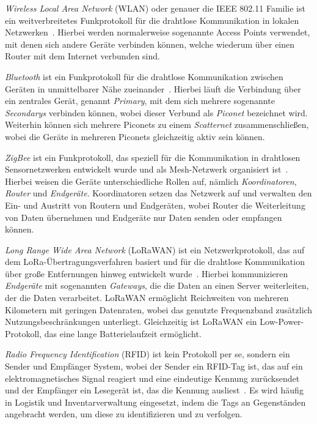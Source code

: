 \emph{Wireless Local Area Network} (WLAN) oder genauer die IEEE 802.11 Familie ist ein weitverbreitetes Funkprotokoll für die drahtlose Kommunikation in lokalen Netzwerken~\cite{wifi}.
Hierbei werden normalerweise sogenannte Access Points verwendet, mit denen sich andere Geräte verbinden können, welche wiederum über einen Router mit dem Internet verbunden sind.

\emph{Bluetooth} ist ein Funkprotokoll für die drahtlose Kommunikation zwischen Geräten in unmittelbarer Nähe zueinander~\cite{bluetooth}.
Hierbei läuft die Verbindung über ein zentrales Gerät, genannt \emph{Primary}, mit dem sich mehrere sogenannte \emph{Secondarys} verbinden können, wobei dieser Verbund als \emph{Piconet} bezeichnet wird.
Weiterhin können sich mehrere Piconets zu einem \emph{Scatternet} zusammenschließen, wobei die Geräte in mehreren Piconets gleichzeitig aktiv sein können.

\emph{ZigBee} ist ein Funkprotokoll, das speziell für die Kommunikation in drahtlosen Sensornetzwerken entwickelt wurde und als Mesh-Netzwerk organisiert ist~\cite{zigbee}.
Hierbei weisen die Geräte unterschiedliche Rollen auf, nämlich \emph{Koordinatoren}, \emph{Router} und \emph{Endgeräte}.
Koordinatoren setzen das Netzwerk auf und verwalten den Ein- und Austritt von Routern und Endgeräten, wobei Router die Weiterleitung von Daten übernehmen und Endgeräte nur Daten senden oder empfangen können.

\emph{Long Range Wide Area Network} (LoRaWAN) ist ein Netzwerkprotokoll, das auf dem LoRa-Übertragungsverfahren basiert und für die drahtlose Kommunikation über große Entfernungen hinweg entwickelt wurde~\cite{lorawan}.
Hierbei kommunizieren \emph{Endgeräte} mit sogenannten \emph{Gateways}, die die Daten an einen Server weiterleiten, der die Daten verarbeitet.
LoRaWAN ermöglicht Reichweiten von mehreren Kilometern mit geringen Datenraten, wobei das genutzte Frequenzband zusätzlich Nutzungsbeschränkungen unterliegt.
Gleichzeitig ist LoRaWAN ein Low-Power-Protokoll, das eine lange Batterielaufzeit ermöglicht.

\emph{Radio Frequency Identification} (RFID) ist kein Protokoll per se, sondern ein Sender und Empfänger System, wobei der Sender ein RFID-Tag ist, das auf ein elektromagnetisches Signal reagiert und eine eindeutige Kennung zurücksendet und der Empfänger ein Lesegerät ist, das die Kennung ausliest~\cite{RFID}.
Es wird häufig in Logistik und Inventarverwaltung eingesetzt, indem die Tags an Gegenständen angebracht werden, um diese zu identifizieren und zu verfolgen.


